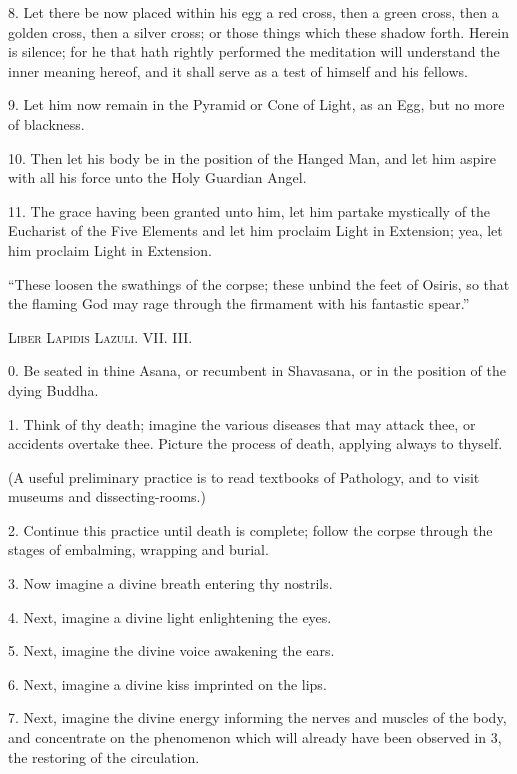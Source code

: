 8. Let there be now placed within his egg a red cross, then a green cross, then a golden cross, then a silver cross; or those things which these shadow forth. Herein is silence; for he that hath rightly performed the meditation will understand the inner meaning hereof, and it shall serve as a test of himself and his fellows.

9. Let him now remain in the Pyramid or Cone of Light, as an Egg, but no more of blackness.

10. Then let his body be in the position of the Hanged Man, and let him aspire with all his force unto the Holy Guardian Angel.

11. The grace having been granted unto him, let him partake mystically of the Eucharist of the Five Elements and let him proclaim Light in Extension; yea, let him proclaim Light in Extension.


\pagebreak



\epigraph{\enquote{These loosen the swathings of the corpse; these unbind the feet of Osiris, so that the flaming God may rage through the firmament with his fantastic spear.}}{\textsc{Liber Lapidis Lazuli. VII. III.}}

0. Be seated in thine Asana, or recumbent in Shavasana, or in the position of the dying Buddha.

1. Think of thy death; imagine the various diseases that may attack thee, or accidents overtake thee. Picture the process of death, applying always to thyself.

(A useful preliminary practice is to read textbooks of Pathology, and to visit museums and dissecting-rooms.)

2. Continue this practice until death is complete; follow the corpse through the stages of embalming, wrapping and burial.

3. Now imagine a divine breath entering thy nostrils.

4. Next, imagine a divine light enlightening the eyes.

5. Next, imagine the divine voice awakening the ears.

6. Next, imagine a divine kiss imprinted on the lips.

7. Next, imagine the divine energy informing the nerves and muscles of the body, and concentrate on the phenomenon which will already have been observed in 3, the restoring of the circulation.

